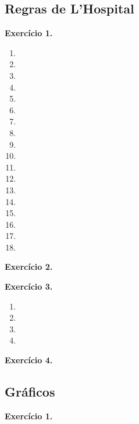 \documentclass[12pt,a4paper]{article}
\begin{document}
\subsection{Regras de L'Hospital}

\vspace{0.5cm}
\noindent\textbf{Exercício 1.}
\begin{enumerate}
    \renewcommand{\theenumi}{\alph{enumi}}
    \renewcommand{\labelenumi}{\theenumi)}
    \item 
    \item 
    \item 
    \item 
    \item 
    \item 
    \item 
    \item 
    \item 
    \item 
    \item 
    \item 
    \item 
    \item 
    \item 
    \item 
    \item 
    \item 
\end{enumerate}

\vspace{0.5cm}
\noindent\textbf{Exercício 2.}

\vspace{0.5cm}
\noindent\textbf{Exercício 3.}
\begin{enumerate}
    \renewcommand{\theenumi}{\alph{enumi}}
    \renewcommand{\labelenumi}{\theenumi)}
    \item 
    \item 
    \item 
    \item 
\end{enumerate}

\vspace{0.5cm}
\noindent\textbf{Exercício 4.}

\subsection{Gráficos}

\vspace{0.5cm}
\noindent\textbf{Exercício 1.}
\end{document}
